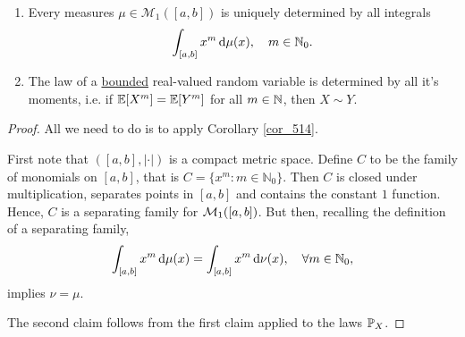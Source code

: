 \begin{lsuperwichtigersatz}
\begin{theorem}\label{coruniq}
	\begin{enumerate}[label=(\roman*)]
		\item Every measures $\mu\in \mathcal M_1([a,b])$ is uniquely determined by all integrals $$\int_{[a,b]} x^m \dint \mu(x),\quad m\in\N_0.$$
		\item The law of a \underline{bounded} real-valued random variable is determined by all it's moments, i.e. if $\E[X^m]=\E[Y^m]$ for all $m\in\N$, then $X\sim Y$.

	\end{enumerate}
\end{theorem}
\end{lsuperwichtigersatz}
\begin{proof}[Proof] All we need to do is to apply Corollary \ref{cor_514}.\smallskip

First note that $([a,b],|\cdot|)$ is a compact metric space. Define $C$ to be the family of monomials on $[a,b]$, that is $C = \{ x^m \colon m \in \mathbb{N}_0 \}$. Then $C$ is closed under multiplication, separates points in $[a,b]$ and contains the constant $1$ function. Hence, $C$ is a separating family for $\cM_1([a,b])$. But then, recalling the definition of a separating family,
\begin{align*}
	\int_{[a,b]} x^m \dint \mu(x)=\int_{[a,b]} x^m \dint \nu(x),\quad \forall m\in\N_0,
\end{align*}
implies $\nu=\mu$.\smallskip

The second claim follows from the first claim applied to the laws $\P_X$.
\end{proof}





